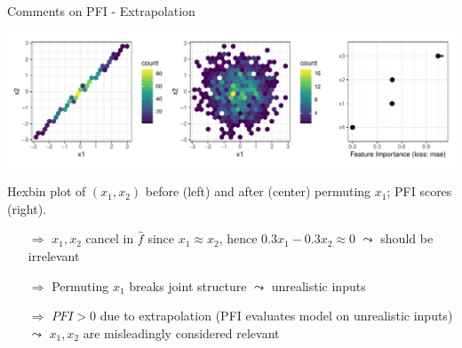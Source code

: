 \documentclass[10pt,compress,t,notes=noshow, xcolor=table]{beamer}
\begin{document}
\begin{frame}{Comments on PFI - Extrapolation}
\pause
\centerline{\includegraphics[width=\linewidth]{figure_man/pfi_hexbin_extrapolation.pdf}}

Hexbin plot of $(x_1, x_2)$ before (left) and after (center) permuting $x_1$;  
PFI scores (right).

\pause

\begin{itemize}
  \item[$\Rightarrow$] $x_1, x_2$ cancel in $\hat{f}$ since $x_1 \approx x_2$, hence $0.3 x_1 - 0.3 x_2 \approx 0$ $\leadsto$ should be irrelevant
  \item[$\Rightarrow$] Permuting $x_1$ breaks joint structure $\leadsto$ unrealistic inputs
  \item[$\Rightarrow$] $PFI > 0$ due to extrapolation (PFI evaluates model on unrealistic inputs)\\ $\leadsto$ $x_1, x_2$ are misleadingly considered relevant
\end{itemize}

\end{frame}
\end{document}
